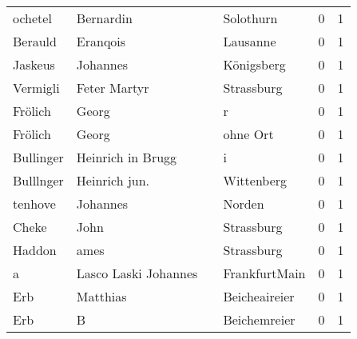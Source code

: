 \documentclass[10pt,a4paper,landscape]{article}
\begin{document}
\begin{longtable}{llllrr}
                  ochetel &                          Bernardin &             &                                   Solothurn &          0 &         1 \\
                  Berauld &                           Eranqois &             &                                    Lausanne &          0 &         1 \\
                  Jaskeus &                           Johannes &             &                                  Königsberg &          0 &         1 \\
                 Vermigli &                       Feter Martyr &             &                                  Strassburg &          0 &         1 \\
                  Frölich &                              Georg &             &                                           r &          0 &         1 \\
                  Frölich &                              Georg &             &                                    ohne Ort &          0 &         1 \\
                Bullinger &                  Heinrich in Brugg &             &                                           i &          0 &         1 \\
                Bulllnger &                      Heinrich jun. &             &                                  Wittenberg &          0 &         1 \\
                  tenhove &                           Johannes &             &                                      Norden &          0 &         1 \\
                    Cheke &                               John &             &                                  Strassburg &          0 &         1 \\
                   Haddon &                               ames &             &                                  Strassburg &          0 &         1 \\
                        a &               Lasco Laski Johannes &             &                               FrankfurtMain &          0 &         1 \\
                      Erb &                           Matthias &             &                               Beicheaireier &          0 &         1 \\
                      Erb &                                  B &             &                                Beichemreier &          0 &         1 \\

\end{longtable}
\end{document}
